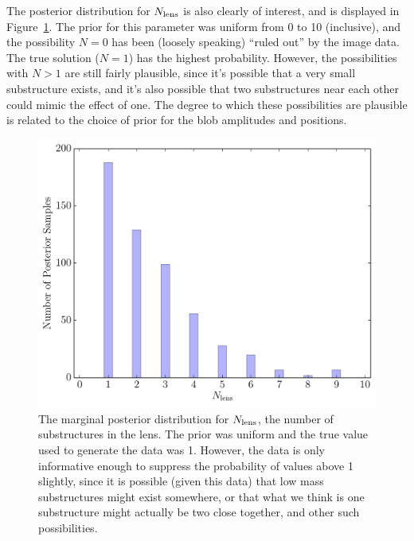 \documentclass[useAMS,usenatbib]{mn2e}
\begin{document}
The posterior distribution for $N_{\rm lens}$ is also clearly of interest, and
is displayed in Figure~\ref{fig:N_lens}. The prior for this parameter was
uniform from 0 to 10 (inclusive), and the possibility $N=0$ has been
(loosely speaking) ``ruled out'' by the image data. The true solution ($N=1$)
has the highest probability. However, the possibilities with $N > 1$ are
still fairly plausible, since it's possible that a very small substructure
exists, and it's also possible that two substructures near each other could
mimic the effect of one. The degree to which these possibilities are plausible
is related to the choice of prior for the blob amplitudes and positions.

\begin{figure}
\begin{center}
\includegraphics[scale=0.4]{N_lens.pdf}
\caption{The marginal posterior distribution for $N_{\rm lens}$, the
number of substructures in the lens. The prior was uniform and the true
value used to generate the data was 1. However, the data is only informative
enough to suppress the probability of values above 1 slightly, since it
is possible (given this data) that low mass substructures might exist somewhere,
or that what we think is one substructure might actually be two close together,
and other such possibilities.
\label{fig:N_lens}}
\end{center}
\end{figure}
\end{document}
